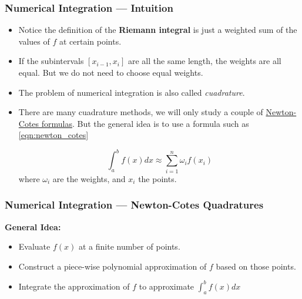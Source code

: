 \documentclass[11pt,xcolor={svgnames},aspectratio=169,usepdftitle=false,notheorems]{beamer}
\begin{document}
\begin{frame}
  \frametitle{Numerical Integration --- Intuition}
\begin{itemize}
  \item Notice the definition of the \alert{\textbf{Riemann integral}} is just a weighted sum of the values of $f$ at certain points.
  \item If the subintervals $[x_{i-1},x_i]$ are all the same length, the weights are all equal. But we do not need to choose equal weights.
  \item The problem of numerical integration is also called \textit{cuadrature}.
  \item There are many cuadrature methods, we will only study a couple of \href{https://en.wikipedia.org/wiki/Newton-Cotes_formulas}{Newton-Cotes formulas}. But the general idea is to use a formula such as \eqref{eqn:newton_cotes}
  
  \begin{equation}
  \int^b_a f(x) dx \approx \sum^n_{i=1}\omega_i f(x_i)
  \label{eqn:newton_cotes}
  \end{equation}
  where $\omega_i$ are the weights, and $x_i$ the points.
\end{itemize}
\end{frame}

\begin{frame}
  \frametitle{Numerical Integration --- Newton-Cotes Quadratures}
  \alert{\textbf{General Idea:}}
\begin{itemize}
  \item Evaluate $f(x)$ at a finite number of points.
  \item Construct a piece-wise polynomial approximation of $f$ based on those points.
  \item Integrate the approximation of $f$ to approximate $\int^b_a f(x)dx$
\end{itemize}
\end{frame}
\end{document}
